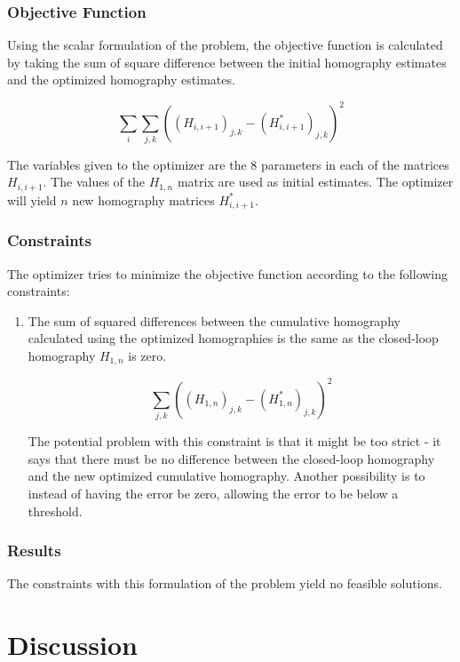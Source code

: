 \documentclass{article}
\begin{document}
\subsubsection{Objective Function}

Using the scalar formulation of the problem, the objective function is
calculated by taking the sum of square difference between the initial
homography estimates and the optimized homography estimates. 

\[\sum_i \sum_{j, k} ((H_{i, i + 1})_{j, k} - (H_{i, i + 1}^{*})_{j, k})^2\] 

The variables given to the optimizer are the 8 parameters in each of the
matrices $H_{i, i + 1}$. The values of the $H_{1, n}$ matrix are used as
initial estimates. The optimizer will yield $n$ new homography matrices $H_{i, i + 1}^{*}$. 

\subsubsection{Constraints}

The optimizer tries to minimize the objective function according to the
following constraints:

\begin{enumerate}

\item The sum of squared differences between the cumulative homography
calculated using the optimized homographies is the same as the closed-loop
homography $H_{1, n}$ is zero.

\[\sum_{j, k} ((H_{1, n})_{j, k} - (H_{1, n}^{*})_{j, k})^2\] 

The potential problem with this constraint is that it might be too strict - it
says that there must be no difference between the closed-loop homography and
the new optimized cumulative homography. Another possibility is to instead of
having the error be zero, allowing the error to be below a threshold.

\end{enumerate}

\subsubsection{Results}

The constraints with this formulation of the problem yield no feasible
solutions. 

\section{Discussion}
\end{document}
